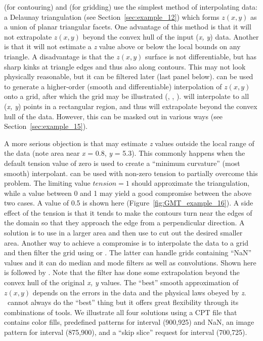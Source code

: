  (for contouring) and 
(for gridding) use the simplest method of interpolating
data:  a Delaunay triangulation (see Section~\ref{sec:example_12}) which
forms $z(x, y)$ as a union of planar triangular facets.
One advantage of this method is that it will not extrapolate
$z(x, y)$ beyond the convex hull of the input ({\it x, y})
data.  Another is that it will not estimate a {\it z} value
above or below the local bounds on any triangle.
A disadvantage is that the $z(x, y)$ surface is not
differentiable, but has sharp kinks at triangle edges and
thus also along contours.  This may not look physically
reasonable, but it can be filtered later (last panel below).
 can be used to generate a higher-order
(smooth and differentiable) interpolation of $z(x, y)$ onto
a grid, after which the grid may be illustrated (,
, ).   will interpolate
to all ({\it x, y}) points in a rectangular region, and thus
will extrapolate beyond the convex hull of the data.  However,
this can be masked out in various ways (see Section~\ref{sec:example_15}).

A more serious objection is that  may estimate
{\it z} values outside the local range of the data (note area
near {\it x} = 0.8, {\it y} = 5.3).  This commonly happens when
the default tension value of zero is used to create a ``minimum
curvature'' (most smooth) interpolant.   can be
used with non-zero tension to partially  overcome this problem.
The limiting value $tension = 1$ should approximate the triangulation,
while a value between 0 and 1 may yield a good compromise between
the above two cases.  A value of 0.5 is shown here
(Figure~\ref{fig:GMT_example_16}).  A side
effect of the tension is that it tends to make the contours turn
near the edges of the domain so that they approach the edge from
a perpendicular direction.  A solution is to use 
in a larger area and then use  to cut out the desired
smaller area.  Another way to achieve a compromise is to
interpolate the data to a grid and then filter the grid using
 or .  The latter can handle grids
containing ``NaN'' values and it can do  median and mode filters
as well as convolutions.  Shown here is  followed
by .  Note that the filter has done some
extrapolation beyond the convex hull of the original {\it x, y}
values.  The ``best'' smooth approximation of $z(x, y)$ depends
on the errors in the data and the physical laws obeyed by {\it z}.
\GMT\ cannot always do the ``best'' thing but it offers great
flexibility through its combinations of tools.  We illustrate all
four solutions using a CPT file that contains color fills,
predefined patterns for interval (900,925) and NaN, an image pattern for interval (875,900),
and a ``skip slice'' request for interval (700,725).

